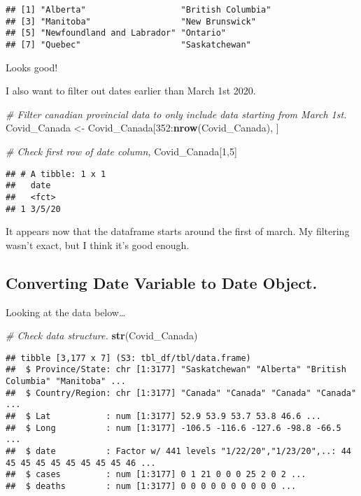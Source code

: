 \documentclass[]{tufte-handout}
\newenvironment{Shaded}{}{}
\newcommand{\CommentTok}[1]{\textcolor[rgb]{0.38,0.63,0.69}{\textit{#1}}}
\newcommand{\DecValTok}[1]{\textcolor[rgb]{0.25,0.63,0.44}{#1}}
\newcommand{\KeywordTok}[1]{\textcolor[rgb]{0.00,0.44,0.13}{\textbf{#1}}}
\newcommand{\NormalTok}[1]{#1}
\newcommand{\OperatorTok}[1]{\textcolor[rgb]{0.40,0.40,0.40}{#1}}
\newcommand{\StringTok}[1]{\textcolor[rgb]{0.25,0.44,0.63}{#1}}
\begin{document}
\begin{verbatim}
## [1] "Alberta"                   "British Columbia"         
## [3] "Manitoba"                  "New Brunswick"            
## [5] "Newfoundland and Labrador" "Ontario"                  
## [7] "Quebec"                    "Saskatchewan"
\end{verbatim}

Looks good!

I also want to filter out dates earlier than March 1st 2020.

\begin{Shaded}
\begin{Highlighting}[]
\CommentTok{# Filter canadian provincial data to only include data starting from March 1st.}
\NormalTok{Covid_Canada <-}\StringTok{ }\NormalTok{Covid_Canada[}\DecValTok{352}\OperatorTok{:}\KeywordTok{nrow}\NormalTok{(Covid_Canada), ]}

\CommentTok{# Check first row of date column,}
\NormalTok{Covid_Canada[}\DecValTok{1}\NormalTok{,}\DecValTok{5}\NormalTok{]}
\end{Highlighting}
\end{Shaded}

\begin{verbatim}
## # A tibble: 1 x 1
##   date  
##   <fct> 
## 1 3/5/20
\end{verbatim}

It appears now that the dataframe starts around the first of march. My
filtering wasn't exact, but I think it's good enough.

\hypertarget{converting-date-variable-to-date-object.}{%
\subsection{Converting Date Variable to Date
Object.}\label{converting-date-variable-to-date-object.}}

Looking at the data below\ldots{}

\begin{Shaded}
\begin{Highlighting}[]
\CommentTok{# Check data structure.}
\KeywordTok{str}\NormalTok{(Covid_Canada)}
\end{Highlighting}
\end{Shaded}

\begin{verbatim}
## tibble [3,177 x 7] (S3: tbl_df/tbl/data.frame)
##  $ Province/State: chr [1:3177] "Saskatchewan" "Alberta" "British Columbia" "Manitoba" ...
##  $ Country/Region: chr [1:3177] "Canada" "Canada" "Canada" "Canada" ...
##  $ Lat           : num [1:3177] 52.9 53.9 53.7 53.8 46.6 ...
##  $ Long          : num [1:3177] -106.5 -116.6 -127.6 -98.8 -66.5 ...
##  $ date          : Factor w/ 441 levels "1/22/20","1/23/20",..: 44 45 45 45 45 45 45 45 45 46 ...
##  $ cases         : num [1:3177] 0 1 21 0 0 0 25 2 0 2 ...
##  $ deaths        : num [1:3177] 0 0 0 0 0 0 0 0 0 0 ...
\end{verbatim}
\end{document}
